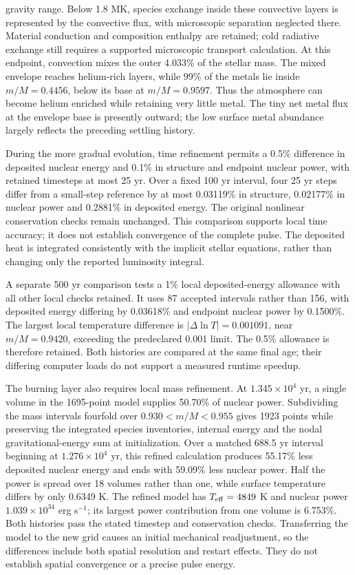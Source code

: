 \documentclass[11pt,letterpaper]{article}
\begin{document}
gravity range.
Below 1.8 MK, species exchange inside these convective layers is represented
by the convective flux, with microscopic separation neglected there.
Material conduction and composition enthalpy are retained; cold radiative
exchange still requires a supported microscopic transport calculation.
At this endpoint, convection mixes the outer 4.033\% of the stellar mass.
The mixed envelope reaches helium-rich layers, while 99\% of the metals
lie inside $m/M=0.4456$, below its base at $m/M=0.9597$. Thus the atmosphere
can become helium enriched while retaining very little metal. The tiny net
metal flux at the envelope base is presently outward; the low surface metal
abundance largely reflects the preceding settling history.

During the more gradual evolution, time refinement permits a 0.5\% difference
in deposited nuclear energy and 0.1\% in structure and endpoint nuclear power,
with retained timesteps at most 25 yr. Over a fixed 100 yr interval, four
25 yr steps differ from a small-step reference by at most 0.03119\% in
structure, 0.02177\% in nuclear power and 0.2881\% in deposited energy.
The original nonlinear conservation checks remain unchanged. This comparison
supports local time accuracy; it does not establish convergence of the complete
pulse. The deposited heat is integrated consistently with the implicit stellar
equations, rather than changing only the reported luminosity integral.

A separate 500 yr comparison tests a 1\% local deposited-energy allowance
with all other local checks retained. It uses 87 accepted intervals rather
than 156, with deposited energy differing by 0.03618\% and endpoint nuclear
power by 0.1500\%. The largest local temperature difference is
$|\Delta\ln T|=0.001091$, near $m/M=0.9420$, exceeding the predeclared
0.001 limit. The 0.5\% allowance is therefore retained. Both histories are
compared at the same final age; their differing computer loads do not support
a measured runtime speedup.

The burning layer also requires local mass refinement. At
$1.345\times10^4$ yr, a single volume in the 1695-point model supplies
50.70\% of nuclear power. Subdividing the mass intervals fourfold over
$0.930<m/M<0.955$ gives 1923 points while preserving the integrated species
inventories, internal energy and the nodal gravitational-energy sum at
initialization. Over a matched 688.5 yr interval beginning at
$1.276\times10^4$ yr, this refined calculation produces 55.17\% less deposited
nuclear energy and ends with 59.09\% less nuclear power. Half the power is
spread over 18 volumes rather than one, while surface temperature differs
by only 0.6349 K. The refined model has $T_{\rm eff}=4849$ K and nuclear power
$1.039\times10^{34}$ erg s$^{-1}$; its largest power contribution from
one volume is 6.753\%. Both histories pass the stated timestep and conservation
checks. Transferring the model to the new grid causes an initial mechanical
readjustment, so the differences include both spatial resolution and restart
effects. They do not establish spatial convergence or a precise pulse energy.
\end{document}
